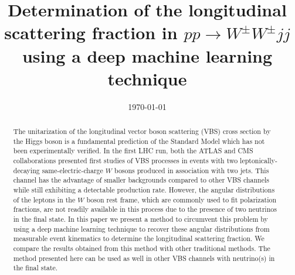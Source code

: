 \documentclass[aps,prd,twocolumn,showpacs,superscriptaddress,groupedaddress]{revtex4}  %
\begin{document}
\title{Determination of the longitudinal scattering fraction in $pp \to W^\pm W^\pm jj$ using a deep machine learning technique}
\author{}
\date{\today}

\begin{abstract}
The unitarization of the longitudinal vector boson scattering (VBS)
cross section by the Higgs boson is a fundamental prediction of the
Standard Model which has not been experimentally verified. In the
first LHC run, both the ATLAS and CMS collaborations presented first
studies of VBS processes in events with two leptonically-decaying
same-electric-charge $W$ bosons produced in association with two jets.
This channel has the advantage of smaller backgrounds compared to
other VBS channels while still exhibiting a detectable production
rate.  However, the angular distributions of the leptons in the $W$
boson rest frame, which are commonly used to fit polarization
fractions, are not readily available in this process due to the
presence of two neutrinos in the final state.  In this paper we
present a method to circumvent this problem by using a deep machine
learning technique to recover these angular distributions from
measurable event kinematics to determine the longitudinal scattering
fraction.  We compare the results obtained from this method with other
traditional methods. The method presented here can be used as well in
other VBS channels with neutrino(s) in the final state.
\end{abstract}

\maketitle


\end{document}
